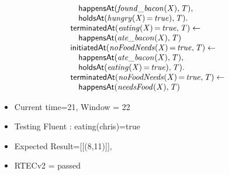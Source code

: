 \documentclass[8pt]{beamer}
\DeclareMathOperator{\val}{=}  %
\def \patsize {}
\def\happensAt{\textsf{\patsize happensAt}}
\def\holdsAt{\textsf{\patsize holdsAt}}
\def\initiatedAt{\textsf{\patsize initiatedAt}}
\def\terminatedAt{\textsf{\patsize terminatedAt}}
\newenvironment{mysplit}%
  {\arraycolsep 0pt \begin{array}{l}}%
  {\end{array}}
\begin{document}
\begin{frame}
\begin{minipage}{0.55\linewidth}
\begin{align*}
\begin{mysplit}
                \quad    \happensAt\mathit{(found\_bacon(X),T),}\\
                \quad    \holdsAt\mathit{(hungry(X)\val true),T).}\\
                \terminatedAt\mathit{(eating(X)\val true,T)\leftarrow}\\
                \quad    \happensAt\mathit{(ate\_bacon(X),T)}\\
                \initiatedAt\mathit{(noFoodNeeds(X)\val true,T)\leftarrow}\\
                \quad    \happensAt\mathit{(ate\_bacon(X),T),}\\
                \quad    \holdsAt\mathit{(eating(X)\val true),T).}\\
                \terminatedAt\mathit{(noFoodNeeds(X)\val true,T)\leftarrow}\\
                \quad    \happensAt\mathit{(needsFood(X),T)}\\
            \end{mysplit}
        \end{align*}
    \end{minipage}
    \begin{itemize}
        \item Current time=21, Window = 22
        \item Testing Fluent :  eating(chris)=true
        \item Expected Result=[[(8,11)]],
        \item RTECv2 = passed
    \end{itemize}
\end{frame}
\end{document}
